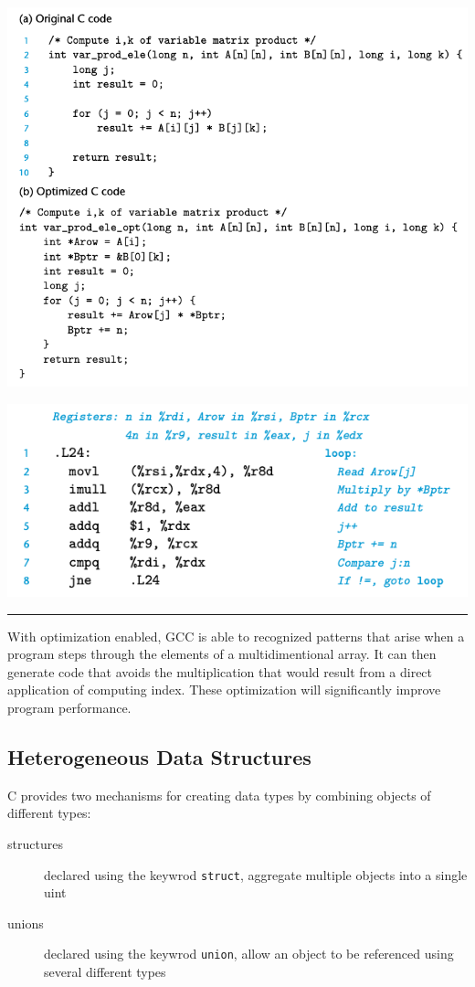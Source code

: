 \documentclass[11pt]{article}
\begin{document}
\begin{center}
\includegraphics[width=.9\linewidth]{pics/original-and-optimized-code-for-variable-size-arrays.png}
\end{center}

\begin{center}
\includegraphics[width=.9\linewidth]{pics/assembly-code-for-original-and-optimized-variable-size-arrays.png}
\end{center}

\noindent\rule{\textwidth}{0.5pt}

With optimization enabled, GCC is able to recognized patterns that arise when a program steps through the elements of a multidimentional array. It can then generate code that avoids the multiplication that would result from a direct application of computing index. These optimization will significantly improve program performance.\\


\subsection{Heterogeneous Data Structures}
\label{sec:orgbdafa11}
C provides two mechanisms for creating data types by combining objects of different types:\\
\begin{description}
\item[{structures}] declared using the keywrod \texttt{struct}, aggregate multiple objects into a single uint\\
\item[{unions}] declared using the keywrod \texttt{union}, allow an object to be referenced using several different types\\
\end{description}
\end{document}
